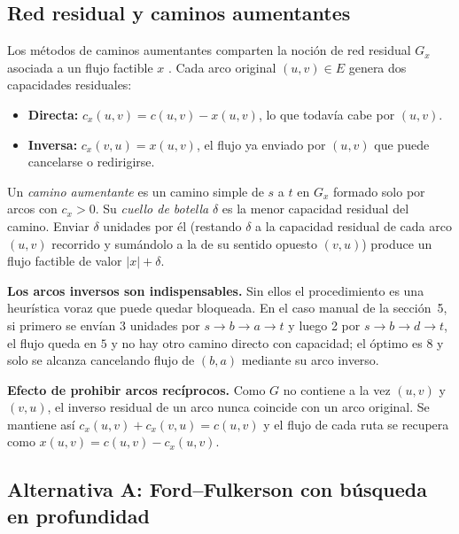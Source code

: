 \documentclass[12pt, a4paper]{article}
\begin{document}
\subsection{Red residual y caminos aumentantes}

Los métodos de caminos aumentantes comparten la noción de red residual $G_x$ asociada a un flujo factible $x$ \cite{ford1956, clrs2009}. Cada arco original $(u,v) \in E$ genera dos capacidades residuales:
\begin{itemize}
  \item \textbf{Directa:} $c_x(u,v) = c(u,v) - x(u,v)$, lo que todavía cabe por $(u,v)$.
  \item \textbf{Inversa:} $c_x(v,u) = x(u,v)$, el flujo ya enviado por $(u,v)$ que puede cancelarse o redirigirse.
\end{itemize}
Un \emph{camino aumentante} es un camino simple de $s$ a $t$ en $G_x$ formado solo por arcos con $c_x > 0$. Su \emph{cuello de botella} $\delta$ es la menor capacidad residual del camino. Enviar $\delta$ unidades por él (restando $\delta$ a la capacidad residual de cada arco $(u,v)$ recorrido y sumándolo a la de su sentido opuesto $(v,u)$) produce un flujo factible de valor $\lvert x\rvert + \delta$.

\textbf{Los arcos inversos son indispensables.} Sin ellos el procedimiento es una heurística voraz que puede quedar bloqueada. En el caso manual de la sección~5, si primero se envían 3 unidades por $s\to b\to a\to t$ y luego 2 por $s\to b\to d\to t$, el flujo queda en $5$ y no hay otro camino directo con capacidad; el óptimo es $8$ y solo se alcanza cancelando flujo de $(b,a)$ mediante su arco inverso.

\textbf{Efecto de prohibir arcos recíprocos.} Como $G$ no contiene a la vez $(u,v)$ y $(v,u)$, el inverso residual de un arco nunca coincide con un arco original. Se mantiene así $c_x(u,v) + c_x(v,u) = c(u,v)$ y el flujo de cada ruta se recupera como $x(u,v) = c(u,v) - c_x(u,v)$.

\subsection{Alternativa A: Ford--Fulkerson con búsqueda en profundidad}
\end{document}
